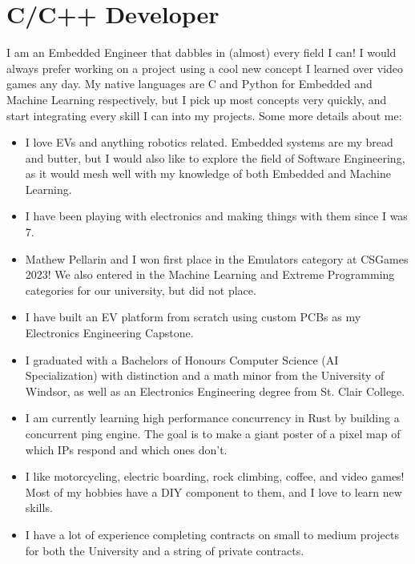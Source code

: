 \section{C/C++ Developer}

I am an Embedded Engineer that dabbles in (almost) every field I can! I would always prefer working on a project using a cool new concept I learned over video games any day. My native languages are C and Python for Embedded and Machine Learning respectively, but I pick up most concepts very quickly, and start integrating every skill I can into my projects. Some more details about me:

\begin{itemize}
  \item I love EVs and anything robotics related. Embedded systems are my bread and butter, but I would also like to explore the field of Software Engineering, as it would mesh well with my knowledge of both Embedded and Machine Learning.
  \item I have been playing with electronics and making things with them since I was 7.
  \item Mathew Pellarin and I won first place in the Emulators category at CSGames 2023! We also entered in the Machine Learning and Extreme Programming categories for our university, but did not place.
  \item I have built an EV platform from scratch using custom PCBs as my Electronics Engineering Capstone.
  \item I graduated with a Bachelors of Honours Computer Science (AI Specialization) with distinction and a math minor from the University of Windsor, as well as an Electronics Engineering degree from St. Clair College.
  \item I am currently learning high performance concurrency in Rust by building a concurrent ping engine. The goal is to make a giant poster of a pixel map of which IPs respond and which ones don't.
  \item I like motorcycling, electric boarding, rock climbing, coffee, and video games! Most of my hobbies have a DIY component to them, and I love to learn new skills.
  \item I have a lot of experience completing contracts on small to medium projects for both the University and a string of private contracts.
\end{itemize}

